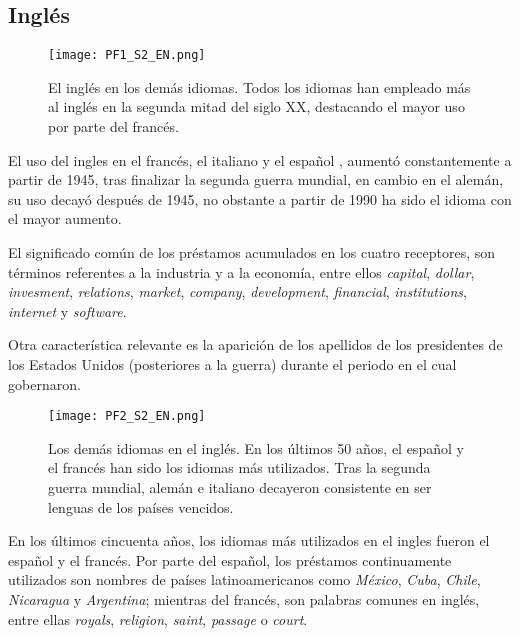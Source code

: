 \subsection{Inglés} %


\begin{figure}%
	\centering
	\texttt{[image: PF1\_S2\_EN.png]}
	\label{fig.ST_a_EN}
	\caption{El inglés en los demás idiomas. Todos los idiomas han empleado más al inglés en la segunda mitad del siglo XX, destacando el mayor uso por parte del francés.}
\end{figure} 



El uso del ingles en el francés, el italiano y el español , aumentó constantemente a partir de 1945, tras finalizar la segunda guerra mundial, en cambio en el alemán, su uso decayó después de 1945, no obstante a partir de 1990 ha sido el idioma con el mayor aumento.

El significado común de los préstamos acumulados  en los cuatro receptores,  son términos referentes a la industria  y a la economía, entre ellos \textit{capital}, \textit{dollar}, \textit{invesment}, \textit{relations}, \textit{market}, \textit{company}, \textit{development}, \textit{financial},  \textit{institutions}, \textit{internet} y \textit{software}. 

Otra característica relevante es la aparición de los apellidos de los presidentes de los Estados Unidos (posteriores a la guerra) durante el periodo en el cual gobernaron. 


\begin{figure}%
	\centering
	\texttt{[image: PF2\_S2\_EN.png]}
	\label{fig.ST_b_EN}
	\caption{Los demás idiomas en el inglés. En los últimos 50 años, el español y el francés han sido los idiomas más utilizados. Tras la segunda guerra mundial, alemán e italiano decayeron consistente en ser lenguas de los países vencidos.}
\end{figure} 


En los últimos cincuenta años, los idiomas más utilizados  en el ingles fueron el español y el francés. Por parte del español, los préstamos continuamente utilizados son nombres de países latinoamericanos como \textit{México}, \textit{Cuba}, \textit{Chile}, \textit{Nicaragua} y \textit{Argentina};   mientras del francés, son palabras comunes en  inglés, entre ellas \textit{royals}, \textit{religion}, \textit{saint}, \textit{passage} o \textit{court}.

